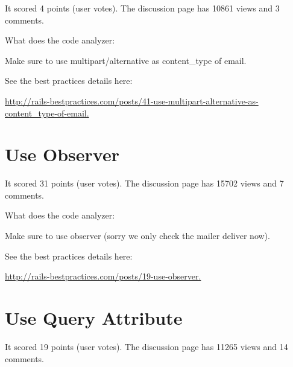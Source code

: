 It scored 4 points (user votes). 
The discussion page has 10861 views and 3 comments.

What does the code analyzer:

Make sure to use multipart/alternative as content\_type of email.

See the best practices details here:
 
\url{http://rails-bestpractices.com/posts/41-use-multipart-alternative-as-content\_type-of-email.}

\section{Use Observer}


It scored 31 points (user votes). 
The discussion page has 15702 views and 7 comments.

What does the code analyzer:

Make sure to use observer (sorry we only check the mailer deliver now).

See the best practices details here:

\url{http://rails-bestpractices.com/posts/19-use-observer.}

\section{Use Query Attribute}


It scored 19 points (user votes). 
The discussion page has 11265 views and 14 comments.

